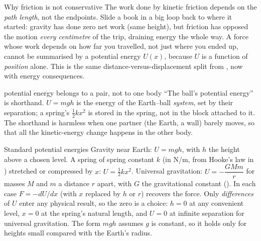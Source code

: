 \begin{remarkbox}{Why friction is not conservative}
The work done by kinetic friction depends on the \emph{path length}, not the endpoints. Slide a book in a big loop back to where it started: gravity has done zero net work (same
height), but friction has opposed the motion \emph{every centimetre} of the trip, draining energy the
whole way. A force whose work depends on how far you
travelled, not just where you ended up, cannot be summarised by a potential energy $U(x)$, because
$U$ is a function of \emph{position} alone. This is the same distance-versus-displacement split from
, now with energy consequences.
\end{remarkbox}

\begin{trapbox}{potential energy belongs to a pair, not to one body}
``The ball's potential energy'' is shorthand. $U=mgh$ is the energy of the Earth--ball \emph{system}, set by
their separation; a spring's $\tfrac12kx^2$ is stored in the spring, not in the block attached to it. The
shorthand is harmless when one partner (the Earth, a wall) barely moves, so that all the
kinetic-energy change happens in the other body.
\end{trapbox}

\begin{figure}[htbp]
\centering
{}
\end{figure}

\begin{keybox}{Standard potential energies}
Gravity near Earth: $U=mgh$, with $h$ the height above a chosen level. A spring of spring constant $k$
(in \si{N/m}, from Hooke's law in ) stretched or compressed by $x$: $U=\tfrac12 kx^2$.
Universal gravitation: $U=-\dfrac{GMm}{r}$ for masses $M$ and $m$ a distance $r$ apart, with $G$ the
gravitational constant (). In each case $F=-dU/dx$ (with $x$ replaced by $h$ or $r$)
recovers the force. Only \emph{differences} of $U$ enter any physical result, so the zero is a choice:
$h=0$ at any convenient level, $x=0$ at the spring's natural length, and $U=0$ at infinite separation
for universal gravitation. The form $mgh$ assumes $g$ is constant, so it holds only for heights small
compared with the Earth's radius.
\end{keybox}

